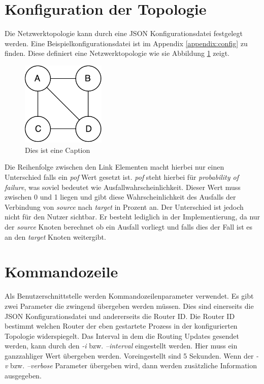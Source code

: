 \documentclass[a4paper,ngerman]{article}
\begin{document}
\section{Konfiguration der Topologie}

Die Netzwerktopologie kann durch eine JSON Konfigurationsdatei festgelegt werden. Eine Beispielkonfigurationsdatei ist im Appendix \ref{appendix:config} zu finden. Diese definiert eine Netzwerktopologie wie sie Abbildung \ref{fig:topology} zeigt.

\begin{figure}[H]
    \centering
    \includegraphics[width=4cm,keepaspectratio]{topology2}
    \caption{Dies ist eine Caption}
    \label{fig:topology}
\end{figure}

Die Reihenfolge zwischen den Link Elementen macht hierbei nur einen Unterschied falls ein \textit{pof} Wert gesetzt ist. \textit{pof} steht hierbei für \textit{probability of failure}, was soviel bedeutet wie Ausfallwahrscheinlichkeit. Dieser Wert muss zwischen 0 und 1 liegen und gibt diese Wahrscheinlichkeit des Ausfalls der Verbindung von \textit{source} nach \textit{target} in Prozent an. Der Unterschied ist jedoch nicht für den Nutzer sichtbar. Er besteht lediglich in der Implementierung, da nur der \textit{source} Knoten berechnet ob ein Ausfall vorliegt und falls dies der Fall ist es an den \textit{target} Knoten weitergibt.

\section{Kommandozeile}

Als Benutzerschnittstelle werden Kommandozeilenparameter verwendet. Es gibt zwei Parameter die zwingend übergeben werden müssen. Dies sind einerseits die JSON Konfigurationsdatei und andererseits die Router ID. Die Router ID bestimmt welchen Router der eben gestartete Prozess in der konfigurierten Topologie widerspiegelt. Das Interval in dem die Routing Updates gesendet werden, kann durch den \textit{-i} bzw. \textit{--interval} eingestellt werden. Hier muss ein ganzzahliger Wert übergeben werden. Voreingestellt sind 5 Sekunden. Wenn der \textit{-v} bzw. \textit{--verbose} Parameter übergeben wird, dann werden zusätzliche Information ausgegeben.
\end{document}
